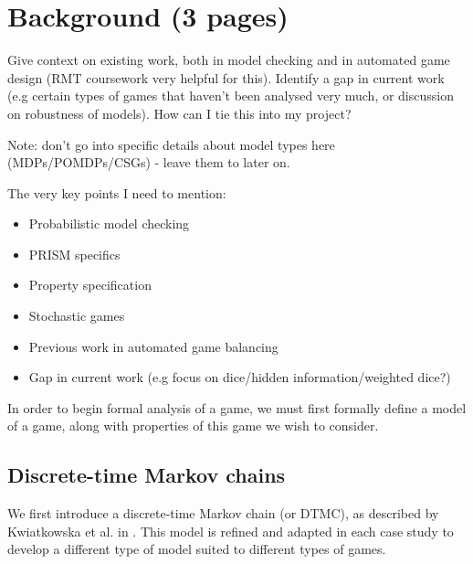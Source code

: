 
\chapter{Background (3 pages)}

Give context on existing work, both in model checking and in automated game design (RMT coursework very helpful for this). Identify a gap in current work (e.g certain types of games that haven't been analysed very much, or discussion on robustness of models). How can I tie this into my project?

Note: don't go into specific details about model types here (MDPs/POMDPs/CSGs) - leave them to later on.

The very key points I need to mention:

\begin{itemize}
    \item Probabilistic model checking
    \item PRISM specifics
    \item Property specification
    \item Stochastic games
    \item Previous work in automated game balancing
    \item Gap in current work (e.g focus on dice/hidden information/weighted dice?)
\end{itemize}

In order to begin formal analysis of a game, we must first formally define a model of a game, along with properties of this game we wish to consider.

\section{Discrete-time Markov chains}
\label{back:stoc_game}

We first introduce a discrete-time Markov chain (or DTMC), as described by Kwiatkowska et al. in \cite{kwiatkowska_stochastic_2007}. This model is refined and adapted in each case study to develop a different type of model suited to different types of games.

